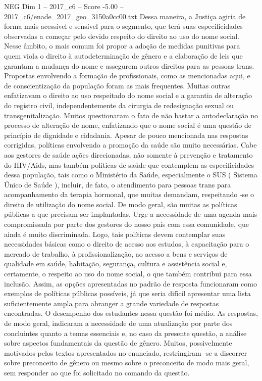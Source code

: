 \begin{textsample}{NEG Dim 1 – 2017\_c6 – Score -5.00 – 2017\_c6/enade\_2017\_geo\_3150a0cc00.txt}
Dessa maneira, a Justiça agiria de forma mais acessível e sensível para o segmento, que terá suas especificidades observadas a começar pelo devido respeito do direito ao uso do nome social.
Nesse âmbito, o mais comum foi propor a adoção de medidas punitivas para quem viola o direito à autodeterminação de gênero e a elaboração de leis que garantam a mudança do nome e assegurem outros direitos para as pessoas trans.
Propostas envolvendo a formação de profissionais, como as mencionadas aqui, e de conscientização da população foram as mais frequentes.
Muitas outras enfatizavam o direito ao uso respeitado do nome social e a garantia de alteração do registro civil, independentemente da cirurgia de redesignação sexual ou transgenitalização.
Muitos questionaram o fato de não bastar a autodeclaração no processo de alteração de nome, enfatizando que o nome social é uma questão de princípio de dignidade e cidadania.
Apesar de pouco mencionada nas respostas corrigidas, políticas envolvendo a promoção da saúde são muito necessárias.
Cabe aos gestores de saúde ações direcionadas, não somente à prevenção e tratamento do HIV/Aids, mas também políticas de saúde que contemplem as especificidades dessa população, tais como o Ministério da Saúde, especialmente o SUS ( Sistema Único de Saúde ), incluir, de fato, o atendimento para pessoas trans para acompanhamento da terapia hormonal, que muitas demandam, respeitando -se o direito de utilização do nome social.
De modo geral, são muitas as políticas públicas a que precisam ser implantadas.
Urge a necessidade de uma agenda mais compromissada por parte dos gestores do nosso país com essa comunidade, que ainda é muito discriminada.
Logo, tais políticas devem contemplar suas necessidades básicas como o direito de acesso aos estudos, à capacitação para o mercado de trabalho, à profissionalização, ao acesso a bens e serviços de qualidade em saúde, habitação, segurança, cultura e assistência social e, certamente, o respeito ao uso do nome social, o que também contribui para essa inclusão.
Assim, as opções apresentadas no padrão de resposta funcionaram como exemplos de políticas públicas possíveis, já que seria difícil apresentar uma lista suficientemente ampla para abranger a grande variedade de respostas encontradas.
O desempenho dos estudantes nessa questão foi médio.
As respostas, de modo geral, indicaram a necessidade de uma atualização por parte dos concluintes quanto a temas essenciais e, no caso da presente questão, a análise sobre aspectos fundamentais da questão de gênero.
Muitos, possivelmente motivados pelos textos apresentados no enunciado, restringiram -se a discorrer sobre preconceito de gênero ou mesmo sobre o preconceito de modo mais geral, sem responder ao que foi solicitado no comando da questão.

\end{textsample}
